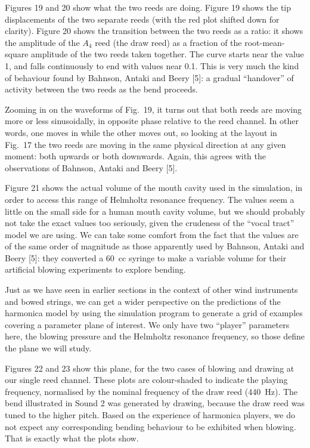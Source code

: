   Figures 19 and 20 show what the two reeds are doing. Figure 19 shows the tip 
  displacements of the two separate reeds (with the red plot shifted down for 
  clarity). Figure 20 shows the transition between the two reeds as a ratio: it 
  shows the amplitude of the $A_4$ reed (the draw reed) as a fraction of the 
  root-mean-square amplitude of the two reeds taken together. The curve starts 
  near the value 1, and falls continuously to end with values near 0.1. This is 
  very much the kind of behaviour found by Bahnson, Antaki and Beery [5]: a 
  gradual “handover” of activity between the two reeds as the bend proceeds. 

  Zooming in on the waveforms of Fig.\ 19, it turns out that both reeds are 
  moving more or less sinusoidally, in opposite phase relative to the reed 
  channel. In other words, one moves in while the other moves out, so looking 
  at the layout in Fig.\ 17 the two reeds are moving in the same physical 
  direction at any given moment: both upwards or both downwards. Again, this 
  agrees with the observations of Bahnson, Antaki and Beery [5]. 

  Figure 21 shows the actual volume of the mouth cavity used in the simulation, 
  in order to access this range of Helmholtz resonance frequency. The values 
  seem a little on the small side for a human mouth cavity volume, but we 
  should probably not take the exact values too seriously, given the crudeness 
  of the “vocal tract” model we are using. We can take some comfort from the 
  fact that the values are of the same order of magnitude as those apparently 
  used by Bahnson, Antaki and Beery [5]: they converted a 60~cc syringe to make 
  a variable volume for their artificial blowing experiments to explore 
  bending. 

  Just as we have seen in earlier sections in the context of other wind 
  instruments and bowed strings, we can get a wider perspective on the 
  predictions of the harmonica model by using the simulation program to 
  generate a grid of examples covering a parameter plane of interest. We only 
  have two “player” parameters here, the blowing pressure and the Helmholtz 
  resonance frequency, so those define the plane we will study. 

  Figures 22 and 23 show this plane, for the two cases of blowing and drawing 
  at our single reed channel. These plots are colour-shaded to indicate the 
  playing frequency, normalised by the nominal frequency of the draw reed 
  (440~Hz). The bend illustrated in Sound 2 was generated by drawing, because 
  the draw reed was tuned to the higher pitch. Based on the experience of 
  harmonica players, we do not expect any corresponding bending behaviour to be 
  exhibited when blowing. That is exactly what the plots show. 

